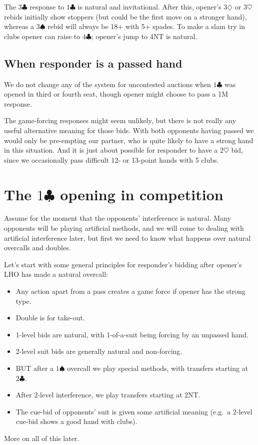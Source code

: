 \documentclass{article}
\newcommand{\sz}{\spadesuit}
\newcommand{\hz}{\heartsuit}
\newcommand{\dz}{\diamondsuit}
\newcommand{\cz}{\clubsuit}
\begin{document}
\vspace{3mm}
The $3\cz$ response to $1\cz$ is natural and invitational. After this, opener's $3\dz$ or $3\hz$ rebids initially show stoppers (but could be the first move on a stronger hand), whereas a $3\sz$ rebid will always be 18+ with 5+ spades. To make a slam try in clubs opener can raise to $4\cz$; opener's jump to 4NT is natural.

\subsection{When responder is a passed hand}

We do not change any of the system for uncontested auctions when $1\cz$ was opened in third or fourth seat, though opener might choose to pass a 1M response.

The game-forcing responses might seem unlikely, but there is not really any useful alternative meaning for those bids. With both opponents having passed we would only be pre-empting our partner, who is quite likely to have a strong hand in this situation. And it is just about possible for responder to have a $2\hz$ bid, since we occasionally pass difficult 12- or 13-point hands with 5 clubs.

\newpage
\section{The $1\cz$ opening in competition}

Assume for the moment that the opponents' interference is natural. Many opponents will be playing artificial methods, and we will come to dealing with artificial interference later, but first we need to know what happens over natural overcalls and doubles.

Let's start with some general principles for responder's bidding after opener's LHO has made a natural overcall:

\begin{itemize}
\item Any action apart from a pass creates a game force if opener has the strong type.
\item Double is for take-out.
\item 1-level bids are natural, with 1-of-a-suit being forcing by an unpassed hand.
\item 2-level suit bids are generally natural and non-forcing.
\item BUT after a $1\sz$ overcall we play special methods, with transfers starting at $2\cz$.
\item After 2-level interference, we play transfers starting at 2NT.
\item The cue-bid of opponents' suit is given some artificial meaning (e.g.~a 2-level cue-bid shows a good hand with clubs).
\end{itemize}
More on all of this later.
\end{document}

